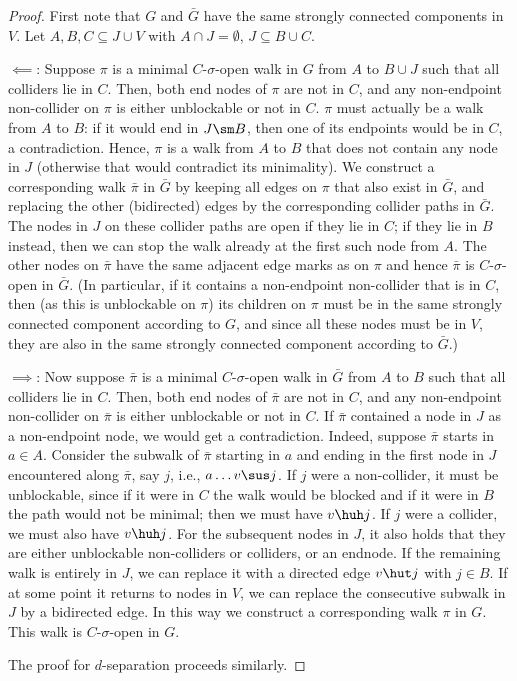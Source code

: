 \begin{proof}
  First note that $G$ and $\bar{G}$ have the same strongly connected components in $V$. 
  Let $A, B, C \subseteq J \cup V$ with $A \cap J = \emptyset$, $J \subseteq B \cup C$.
  
  $\impliedby$: Suppose $\pi$ is a minimal $C$-$\sigma$-open walk in $G$ from $A$ to $B \cup J$ such that all colliders lie in $C$.
  Then, both end nodes of $\pi$ are not in $C$, and any non-endpoint non-collider on $\pi$ is either unblockable or not in $C$.
  $\pi$ must actually be a walk from $A$ to $B$:
  if it would end in $J \sm B$, then one of its endpoints would be in $C$, a contradiction.
  Hence, $\pi$ is a walk from $A$ to $B$ that does not contain any node in $J$ (otherwise that would contradict its minimality).
  We construct a corresponding walk $\bar\pi$ in $\bar{G}$ by keeping all edges on $\pi$ that also exist in $\bar{G}$, and replacing the other (bidirected) edges by the corresponding collider paths in $\bar{G}$.
  The nodes in $J$ on these collider paths are open if they lie in $C$; if they lie in $B$ instead, then we can stop the walk already at the first such node from $A$.
  The other nodes on $\bar{\pi}$ have the same adjacent edge marks as on $\pi$ and hence $\bar{\pi}$
  is $C$-$\sigma$-open in $\bar{G}$.
  (In particular, if it contains a non-endpoint non-collider that is in $C$, then (as this is unblockable on $\pi$) its children on $\pi$ must be in the same strongly connected component according to $G$, and since all these nodes must be in $V$, they are also in the same strongly connected component according to $\bar{G}$.)

  $\implies$: Now suppose $\bar{\pi}$ is a minimal $C$-$\sigma$-open walk in $\bar{G}$ from $A$ to $B$ such that all colliders lie in $C$.
  Then, both end nodes of $\bar{\pi}$ are not in $C$, and any non-endpoint non-collider on $\bar{\pi}$ is either unblockable or not in $C$.
  If $\bar{\pi}$ contained a node in $J$ as a non-endpoint node, we would get a contradiction.
  Indeed, suppose $\bar{\pi}$ starts in $a \in A$.
  Consider the subwalk of $\bar{\pi}$ starting in $a$ and ending in the first node in $J$ encountered along $\bar{\pi}$, say $j$,
  i.e., $a \dots v \sus j$.
  If $j$ were a non-collider, it must be unblockable, since if it were in $C$ the walk would be blocked and if it were in $B$ the path would not be minimal; then we must have $v \huh j$.
  If $j$ were a collider, we must also have $v \huh j$.
  For the subsequent nodes in $J$, it also holds that they are either unblockable non-colliders or colliders, or an endnode.
  If the remaining walk is entirely in $J$, we can replace it with a directed edge $v \hut j$ with $j \in B$.
  If at some point it returns to nodes in $V$, we can replace the consecutive subwalk in $J$ by a bidirected edge.
  In this way we construct a corresponding walk $\pi$ in $G$.
  This walk is $C$-$\sigma$-open in $G$.

  The proof for $d$-separation proceeds similarly.
\end{proof}

